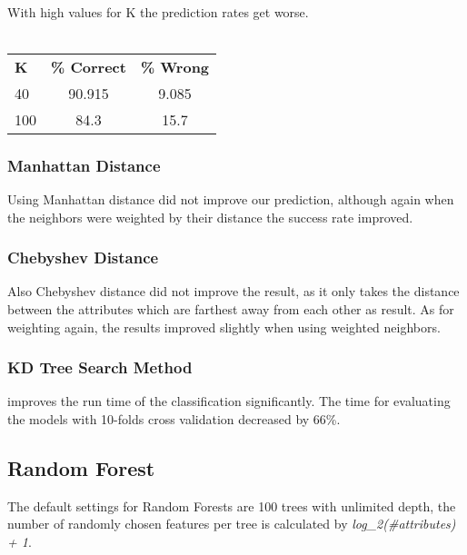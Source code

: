\documentclass{article}
\begin{document}
\paragraph{}With high values for K the prediction rates get worse. 
\\\\
\begin{center}
\begin{tabular}{ l | c | c }
\textbf{K} & \textbf{\% Correct} & \textbf{\% Wrong} \\
40 & 90.915 & 9.085 \\
100 &  84.3 & 15.7 \\
\end{tabular}
\end{center}
\subsubsection{Manhattan Distance} Using Manhattan distance did not improve our prediction, although again when the neighbors were weighted by their distance the success rate improved.
\subsubsection{Chebyshev Distance} Also Chebyshev distance did not improve the result, as it only takes the distance between the attributes which are farthest away from each other as result. As for weighting again, the results improved slightly when using weighted neighbors.
\subsubsection{KD Tree Search Method} improves the run time of the classification significantly. The time for evaluating the models with 10-folds cross validation decreased by 66\%. 

\subsection{Random Forest}
The default settings for Random Forests are 100 trees with unlimited depth, the number of randomly chosen features per tree is calculated by \textit{log\_2(\#attributes) + 1}.
\end{document}
